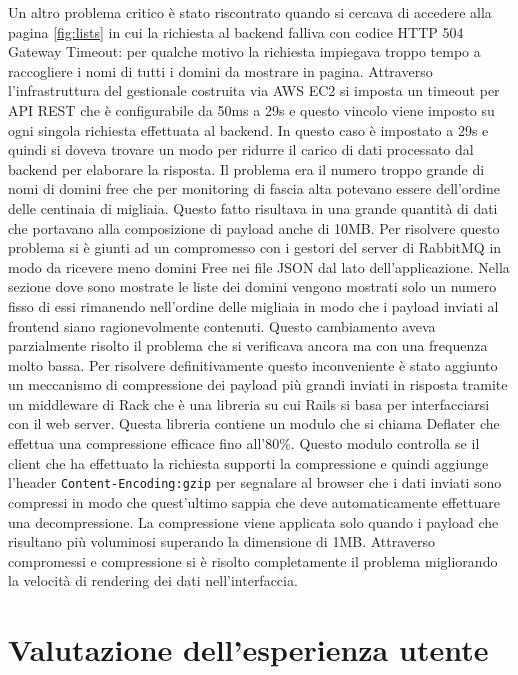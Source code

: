 \documentclass[target=bach,aauheader=,style=]{thud}
\begin{document}
Un altro problema critico è stato riscontrato quando si cercava di accedere alla pagina \ref{fig:lists} in cui la richiesta al backend falliva con codice HTTP 504 Gateway Timeout: per qualche motivo la
richiesta impiegava troppo tempo a raccogliere i nomi di tutti i domini da mostrare in pagina.
Attraverso l'infrastruttura del gestionale costruita via AWS EC2 si imposta un timeout per API REST che è configurabile da 50ms a 29s e questo vincolo viene imposto su ogni singola richiesta
effettuata al backend. In questo caso è impostato a 29s e quindi si doveva trovare un modo per ridurre il carico di dati processato dal backend per elaborare la risposta.
Il problema era il numero troppo grande di nomi di domini free che per monitoring di fascia alta potevano
essere dell'ordine delle centinaia di migliaia. Questo fatto risultava in una grande quantità di dati che portavano alla composizione di payload anche di 10MB.
Per risolvere questo problema si è giunti ad un compromesso con i gestori del server di RabbitMQ in modo da ricevere meno domini Free nei file JSON dal lato dell'applicazione. Nella sezione dove sono
mostrate le liste dei domini vengono mostrati solo un numero fisso di essi rimanendo nell'ordine delle migliaia in modo che i payload inviati al frontend siano ragionevolmente contenuti.
Questo cambiamento aveva parzialmente risolto il problema che si verificava ancora ma con una frequenza molto bassa. Per risolvere definitivamente questo inconveniente è stato aggiunto un
meccanismo di compressione dei payload più grandi inviati in risposta tramite un middleware di Rack \cite{rack} che è una libreria su cui Rails si basa per interfacciarsi con il web server.
Questa libreria contiene un modulo che si chiama Deflater che effettua una compressione efficace fino all'80\%. Questo modulo controlla se il client che ha effettuato la richiesta supporti la
compressione e quindi aggiunge l'header \texttt{Content-Encoding:gzip} per segnalare al browser che i dati inviati sono compressi in modo che quest'ultimo sappia che deve automaticamente effettuare
una decompressione. La compressione viene applicata solo quando i payload che risultano più voluminosi superando la dimensione di 1MB. Attraverso compromessi e compressione si è risolto completamente
il problema migliorando la velocità di rendering dei dati nell'interfaccia.

\section{Valutazione dell'esperienza utente}
\end{document}

